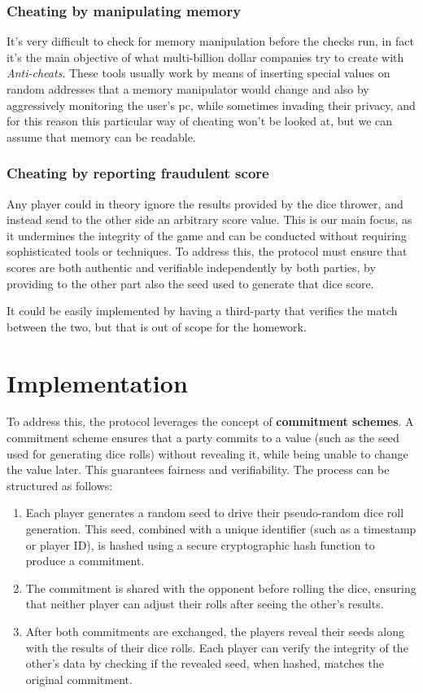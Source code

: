 \documentclass{article}
\begin{document}
\subsubsection*{Cheating by manipulating memory}

It's very difficult to check for memory manipulation before the checks run, in fact it's the main objective of what multi-billion dollar companies try to create with \emph{Anti-cheats}. These tools usually work by means of inserting special values on random addresses that a memory manipulator would change and also by aggressively monitoring the user's pc, while sometimes invading their privacy, and for this reason this particular way of cheating won't be looked at, but we can assume that memory can be readable.

\subsubsection*{Cheating by reporting fraudulent score}
Any player could in theory ignore the results provided by the dice thrower, and instead send to the other side an arbitrary score value. This is our main focus, as it undermines the integrity of the game and can be conducted without requiring sophisticated tools or techniques. To address this, the protocol must ensure that scores are both authentic and verifiable independently by both parties, by providing to the other part also the seed used to generate that dice score.

It could be easily implemented by having a third-party that verifies the match between the two, but that is out of scope for the homework.

\section{Implementation}
To address this, the protocol leverages the concept of \textbf{commitment schemes}. A commitment scheme ensures that a party commits to a value (such as the seed used for generating dice rolls) without revealing it, while being unable to change the value later. This guarantees fairness and verifiability. The process can be structured as follows:

\begin{enumerate}

    \item Each player generates a random seed to drive their pseudo-random dice roll generation. This seed, combined with a unique identifier (such as a timestamp or player ID), is hashed using a secure cryptographic hash function to produce a commitment.

    \item The commitment is shared with the opponent before rolling the dice, ensuring that neither player can adjust their rolls after seeing the other's results.

    \item After both commitments are exchanged, the players reveal their seeds along with the results of their dice rolls. Each player can verify the integrity of the other’s data by checking if the revealed seed, when hashed, matches the original commitment.
\end{enumerate}
\end{document}

